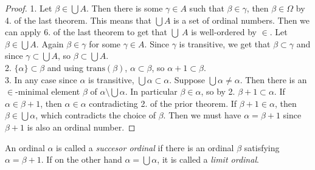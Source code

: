 \begin{proof}
    1. Let $\beta \in \bigcup A$. Then there is some $\gamma\in A$ such that $\beta \in \gamma$, then $\beta \in \Omega$ by 4. of the last theorem. This means that $\bigcup A$ is a set of ordinal numbers. Then we can apply 6. of the last theorem to get that $\bigcup \ A$ is well-ordered by $\in$. Let $\beta\in \bigcup A$. Again $\beta\in \gamma$ for some $\gamma\in A$. Since $\gamma$ is transitive, we get that $\beta\subset \gamma$ and since $\gamma\subset \bigcup A$, so $\beta \subset \bigcup A$.\\
    2. $\{\alpha\}\subset \beta$ and using $\mathrm{trans}(\beta)$, $\alpha\subset \beta$, so $\alpha+1\subset \beta$.\\
    3. In any case since $\alpha$ is transitive, $\bigcup\alpha \subset \alpha$. Suppose $\bigcup \alpha\neq \alpha$. Then there is an $\in$-minimal element $\beta$ of $\alpha\setminus \bigcup\alpha$. In particular $\beta\in \alpha$, so by 2. $\beta+1\subset \alpha$. If $\alpha\in \beta+1$, then $\alpha\in \alpha$ contradicting 2. of the prior theorem. If $\beta +1 \in \alpha$, then $\beta\in \bigcup\alpha$, which contradicts the choice of $\beta$. Then we must have $\alpha = \beta+1$ since $\beta+1$ is also an ordinal number.    
\end{proof}
\begin{definition}
    An ordinal $\alpha$ is called a \textit{succesor ordinal} if there is an ordinal $\beta$ satisfying $\alpha=\beta+1$. If on the other hand $\alpha = \bigcup \alpha$, it is called a \textit{limit ordinal}.
\end{definition}
